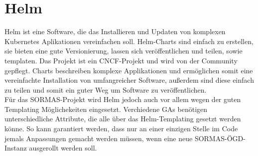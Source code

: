 \section{Helm}
Helm ist eine Software, die das Installieren und Updaten von komplexen Kubernetes Aplikationen vereinfachen soll.
Helm-Charts sind einfach zu erstellen, sie bieten eine gute Versionierung, lassen sich veröffentlichen und teilen, sowie templaten.
Das Projekt ist ein \ac{CNCF}-Projekt und wird von der Community gepflegt.
Charts beschreiben komplexe Applikationen und ermöglichen somit eine vereinfachte Installation von umfangreicher Software, außerdem sind diese einfach zu teilen und somit ein guter Weg um Software zu veröffentlichen.
\cite{helm}
\\
Für das \ac{SORMAS}-Projekt wird Helm jedoch auch vor allem wegen der guten Templating Möglichekeiten eingesetzt.
Verchiedene \ac{GAs} benötigen unterschiedliche Attribute, die alle über das Helm-Templating gesetzt werden könne.
So kann garantiert werden, dass nur an einer einzigen Stelle im Code jemals Anpassungen gemacht werden müssen, wenn eine neue \ac{SORMAS-ÖGD}-Instanz ausgerollt werden soll.

